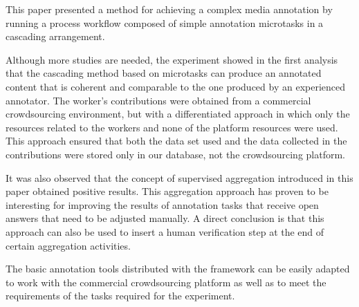 This paper presented a method for achieving a complex media annotation by running a process workflow composed of simple annotation microtasks in a cascading arrangement. 




Although more studies are needed, the experiment showed in the first analysis that the cascading method based on microtasks can produce an annotated content that is coherent and comparable to the one produced by an experienced annotator. The worker's contributions were obtained from a commercial crowdsourcing environment, but with a differentiated approach in which only the resources related to the workers and none of the platform resources were used. This approach ensured that both the data set used and the data collected in the contributions were stored only in our database, not the crowdsourcing platform.


It was also observed that the concept of supervised aggregation introduced in this paper obtained positive results. This aggregation approach has proven to be interesting for improving the results of annotation tasks that receive open answers that need to be adjusted manually. A direct conclusion is that this approach can also be used to insert a human verification step at the end of certain aggregation activities.


The basic annotation tools distributed with the framework can be easily adapted to work with the commercial crowdsourcing platform as well as to meet the requirements of the tasks required for the experiment.

